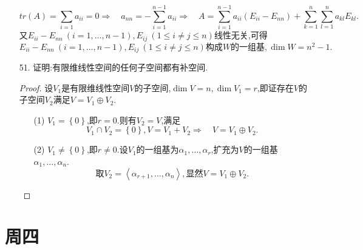 \documentclass{article}
\begin{document}
\begin{enumerate}
    \[
        tr(A)=\sum\limits_{i=1} a_{ii}=0
        \Rightarrow\quad
        a_{nn}=-\sum\limits_{i=1}^{n-1} a_{ii}
        \Rightarrow\quad
        A=\sum\limits_{i=1}^{n-1} a_{ii} (E_{ii}-E_{nn})+\sum\limits_{k=1}^{n}\sum\limits_{l=1}^{n} a_{kl}E_{kl}.
    \]
    又$E_{ii}-E_{nn}\ (i=1,\ldots,n-1),E_{ij}\ (1\leqslant i\neq j\leqslant n)$线性无关,可得
    \[
        E_{ii}-E_{nn}\ (i=1,\ldots,n-1),E_{ij}\ (1\leqslant i\neq j\leqslant n)\mbox{构成}W\mbox{的一组基},\dim W=n^2 -1.
    \]
    \item [51.]证明:有限维线性空间的任何子空间都有补空间.
    \begin{proof}
        设$V_1$是有限维线性空间$V$的子空间,$\dim V=n,\dim V_1=r$,即证存在$V$的子空间$V_2$满足$V=V_1\oplus V_2$.
        \begin{enumerate}
            \item [(1)]$V_1=\left\{ 0\right\}$,即$r=0$.则有$V_2=V$,满足
            \[
                V_1\cap V_2=\left\{ 0\right\},V=V_1+ V_2
                \Rightarrow\quad
                V=V_1\oplus V_2.
            \]
            \item [(2)]$V_1\neq \left\{ 0\right\}$,即$r\neq 0$.设$V_1$的一组基为$\alpha_1,\ldots,\alpha_r$,扩充为$V$的一组基$\alpha_1,\ldots,\alpha_n$.
            \[
                \mbox{取} V_2=\left\langle \alpha_{r+1},\ldots,\alpha_n\right\rangle,\mbox{显然}V=V_1\oplus V_2.
            \]
        \end{enumerate}
    \end{proof}
\end{enumerate}
\section{周四}
\end{document}
